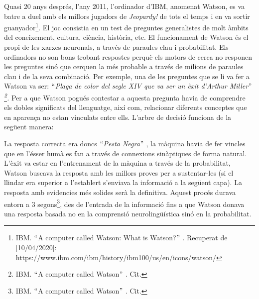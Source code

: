 \documentclass[12pt]{article}
\renewcommand{\_}{\kern-1.5pt\textunderscore\kern-1.5pt}
\begin{document}
\begin{itemize}
\vspace{\baselineskip}
Quasi 20 anys després, l’any 2011, l’ordinador d’IBM, anomenat Watson, es va batre a duel amb els millors jugadors de \textit{Jeopardy!} de tots el temps i en va sortir guanyador\footnote{ IBM. $``$A computer called Watson: What is Watson?$"$ . Recuperat de [10/04/2020]: https://www.ibm.com/ibm/history/ibm100/us/en/icons/watson/  }. El joc consistia en un test de preguntes generalistes de molt àmbits del coneixement, cultura, ciència, història, etc. El funcionament de Watson és el propi de les xarxes neuronals, a través de paraules clau i probabilitat. Els ordinadors no son bons trobant respostes perquè els motors de cerca no responen les preguntes sinó que cerquen la més probable a través de milions de paraules clau i de la seva combinació.  Per exemple, una de les preguntes que se li va fer a Watson va ser: \textit{$``$Plaga de color del segle XIV que va ser un èxit d’Arthur Miller$"$ \footnote{ IBM. $``$A computer called Watson$"$ . Cit.  }. }Per a que Watson pogués contestar a aquesta pregunta havia de comprendre els dobles significats del llenguatge, així com, relacionar diferents conceptes que en aparença no estan vinculats entre ells. L’arbre de decisió funciona de la següent manera: \par


\vspace{\baselineskip}
La resposta correcta era doncs $``$\textit{Pesta Negra}$"$ , la màquina havia de fer vincles que en l’ésser humà es fan a través de connexions sinàptiques de forma natural. L’èxit va estar en l’entrenament de la màquina a través de la probabilitat, Watson buscava la resposta amb les millors proves per a sustentar-les (si el llindar era superior a l’establert s’enviava la informació a la següent capa). La resposta amb evidencies més solides serà la definitiva. Aquest procés durava entorn a 3 segons\footnote{  IBM. $``$A computer called Watson$"$ . Cit.  }, des de l’entrada de la informació fins a que Watson donava una resposta basada no en la comprensió neurolingüística sinó en la probabilitat.\par



\end{itemize}
\end{document}
